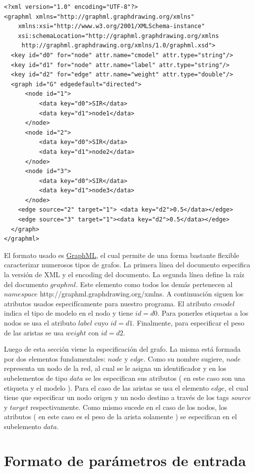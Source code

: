 \documentclass[a4paper,12pt]{article}
\begin{document}
\begin{lstlisting}
<?xml version="1.0" encoding="UTF-8"?>
<graphml xmlns="http://graphml.graphdrawing.org/xmlns"  
    xmlns:xsi="http://www.w3.org/2001/XMLSchema-instance"
    xsi:schemaLocation="http://graphml.graphdrawing.org/xmlns
     http://graphml.graphdrawing.org/xmlns/1.0/graphml.xsd">
  <key id="d0" for="node" attr.name="cmodel" attr.type="string"/>
  <key id="d1" for="node" attr.name="label" attr.type="string"/>
  <key id="d2" for="edge" attr.name="weight" attr.type="double"/>
  <graph id="G" edgedefault="directed">
	  <node id="1">
		  <data key="d0">SIR</data>
		  <data key="d1">node1</data>
	  </node>
	  <node id="2">
		  <data key="d0">SIR</data>
		  <data key="d1">node2</data>
	  </node>
	  <node id="3">
		  <data key="d0">SIR</data>
		  <data key="d1">node3</data>
	  </node>
	<edge source="2" target="1"> <data key="d2">0.5</data></edge>
	<edge source="3" target="1"><data key="d2">0.5</data></edge>
  </graph>
</graphml>
\end{lstlisting}

El formato usado es \href{http://graphml.graphdrawing.org/}{GraphML}, el cual permite de una forma bastante flexible caracterizar  numerosos tipos de grafos. La primera línea del documento especifica la versión de XML y el encoding del documento. La segunda línea define la raíz del documento $graphml$. Este elemento como todos los demás pertenecen al $namespace$  http://graphml.graphdrawing.org/xmlns. A continuación siguen los atributos usados especifícamente para nuestro programa. El atributo $cmodel$ indica el tipo de modelo en el nodo y tiene $id=d0$. Para ponerles etiquetas a los nodos se usa el atributo $label$ cuyo $id=d1$. Finalmente, para especificar el peso de las aristas se usa $weight$ con $id=d2$.

Luego de esta sección viene la especificación del grafo. La misma está formada por dos elementos fundamentales: $node$ y $edge$. Como su nombre sugiere, $node$ representa un nodo de la red, al cual se le asigna un identificador y en los subelementos de tipo $data$ se les especifican sus atributos ( en este caso son una etiqueta y el modelo ). Para el caso de las aristas se usa el elemento $edge$, el cual tiene  que especificar un nodo origen y un nodo destino a través de los tags $source$ y $target$ respectivamente. Como mismo sucede en el caso de los nodos, los atributos ( en este caso es el peso de la arista solamente ) se especifican en el subelemento $data$. 

\section*{Formato de parámetros de entrada}
\end{document}

